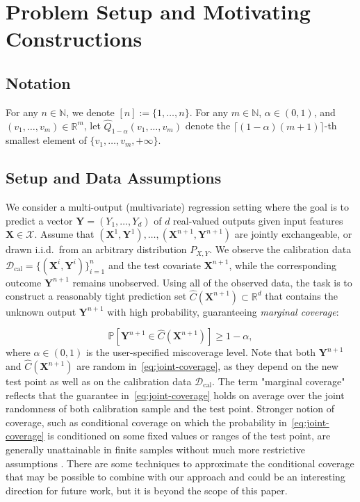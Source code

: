 \section{Problem Setup and Motivating Constructions}
\label{sec:preliminaries}

\subsection{Notation}

For any $n \in \mathbb{N}$, we denote $[n] := \{1,\ldots,n\}$.
For any $m\in\mathbb{N}$, $\alpha\in(0,1)$, and
$(v_1,\ldots,v_m)\in\mathbb{R}^m$, let
$\widehat Q_{1-\alpha}(v_1,\ldots,v_m)$
denote the $\lceil(1-\alpha)(m+1)\rceil$-th smallest element of
$\{v_1,\ldots,v_m,+\infty\}$.

\subsection{Setup and Data Assumptions}

{\color{blue} We consider a multi-output (multivariate) regression setting where the
goal is to predict a vector
$\mathbf{Y}=(Y_1,\ldots,Y_d)$ of $d$ real-valued outputs given input
features $\mathbf{X}\in\mathcal{X}$.
Assume that
$(\mathbf{X}^1,\mathbf{Y}^1),\ldots,(\mathbf{X}^{n+1},\mathbf{Y}^{n+1})$ are jointly exchangeable, or drawn
i.i.d.\ from an arbitrary distribution $P_{X,Y}$. We observe the
calibration data $\mathcal D_{\mathrm{cal}}=\{(\mathbf{X}^i,\mathbf{Y}^i)\}_{i=1}^n$
and the test covariate $\mathbf{X}^{n+1}$, while the corresponding outcome
$\mathbf{Y}^{n+1}$ remains unobserved.
Using all of the observed data, the task is to construct a reasonably tight prediction set $\hat{C}(\mathbf{X}^{n+1}) \subset \mathbb{R}^d$ that contains the unknown output $\mathbf{Y}^{n+1}$ with high probability, guaranteeing \emph{marginal coverage}:

\begin{equation}
\mathbb{P}\!\left[ \mathbf{Y}^{n+1} \in \hat{C}(\mathbf{X}^{n+1}) \right] \ge 1 - \alpha,
\label{eq:joint-coverage}
\end{equation}
where $\alpha \in (0,1)$ is the user-specified miscoverage level.  
Note that both $\mathbf{Y}^{n+1}$ and $\hat{C}(\mathbf{X}^{n+1})$ are random in~\eqref{eq:joint-coverage}, as they depend on the new test point as well as on the calibration data $\mathcal{D}_{\mathrm{cal}}$.  
The term "marginal coverage" reflects that the guarantee in~\eqref{eq:joint-coverage} holds on average over the joint randomness of both calibration sample and the test point. Stronger notion of coverage, such as conditional coverage on which the probability in~\eqref{eq:joint-coverage} is conditioned on some fixed values or ranges of the test point, are generally unattainable in finite samples without much more restrictive assumptions \citep{foygel2021limits}. There are some techniques to approximate the conditional coverage \citep{Romano2020With,gibbs2025conformal} that may be possible to combine with our approach and could be an interesting direction for future work, but it is beyond the scope of this paper.}

